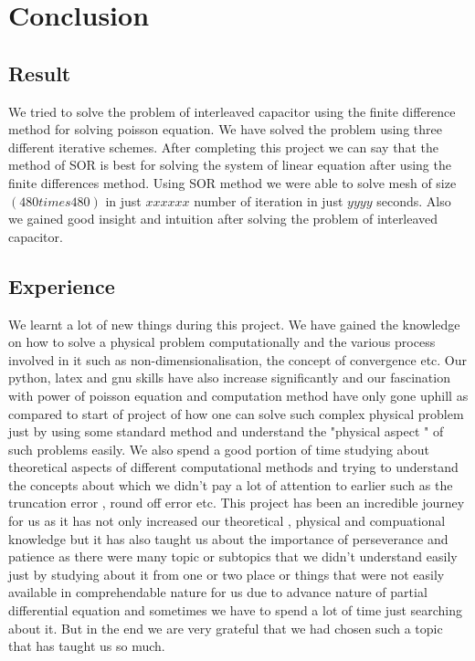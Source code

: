 \section{Conclusion}
\subsection{Result}
We tried to solve the problem of interleaved capacitor using the finite difference method for solving poisson equation. We have solved the problem using three different iterative schemes. After completing this project we can say that the method of SOR is best for solving the system of linear equation after using the finite differences method. Using SOR method we were able to solve mesh of size $ (480 times 480) $ in just $ xxxxxx $ number of iteration in just $  yyyy $ seconds. Also we gained good insight and intuition after solving the problem of interleaved capacitor.
\subsection{Experience}
We learnt a lot of new things during this project. We have gained the knowledge on how to solve a physical problem computationally and the various process involved in it such as non-dimensionalisation, the concept of convergence etc. Our python, latex and gnu skills have also increase significantly and our fascination with power of poisson equation and computation method have only gone uphill as compared to start of project of how one can solve such complex physical problem just by using some standard method and understand the "physical aspect " of such problems easily. We also spend a good portion of time studying about theoretical aspects of different computational methods and trying to understand the concepts about which we didn't pay a lot of attention to earlier such as the truncation error , round off error etc. This project has been an incredible journey for us as it has not only increased our theoretical , physical and compuational knowledge but it has also taught us about the importance of perseverance and patience as there were many topic or subtopics that we didn't understand easily just by studying about it from one or two place or things that were not easily available in comprehendable nature for us due to advance nature of partial differential equation and sometimes we have to spend a lot of time just searching about it. But in the end we are very grateful that we had chosen such a topic that has taught us so much. 
